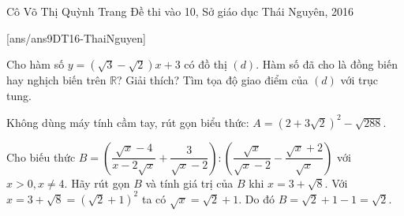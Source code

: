 \begin{name}
{Cô Võ Thị Quỳnh Trang}
{Đề thi vào 10, Sở giáo dục Thái Nguyên, 2016}
\end{name}
\setcounter{ex}{0}
[ans/ans9DT16-ThaiNguyen]
\begin{ex}%
   Cho hàm số $y=\left( \sqrt{3}-\sqrt{2}\right)x +3 $ có đồ thị $(d)$. Hàm số đã cho là đồng biến hay nghịch biến trên 
   $\mathbb{R}$? Giải thích? Tìm tọa độ giao điểm của $(d)$ với trục tung.
\end{ex}

\begin{ex}%
	Không dùng máy tính cầm tay, rút gọn biểu thức: $A=\left(2+3\sqrt{2}\right) ^2 - 
	\sqrt{288}$.
\end{ex}

\begin{ex}%
	Cho biếu thức $B= \left( \dfrac{\sqrt{x}-4}{x-2\sqrt{x}}+ \dfrac{3}{\sqrt{x}-2}\right) : \left( \dfrac{\sqrt{x}}{\sqrt{x}-2} - \dfrac{\sqrt{x}+2}{\sqrt{x}}\right)$ với $x>0, x \neq 4$. Hãy rút gọn $B$ và tính giá trị của $B$ khi $x=3+\sqrt{8}.$
Với $x=3+\sqrt{8}=\left(\sqrt{2}+1\right)^2$ ta có $\sqrt{x}=\sqrt{2}+1$. Do đó $B=\sqrt{2}+1-1=\sqrt{2}$.
\end{ex}

